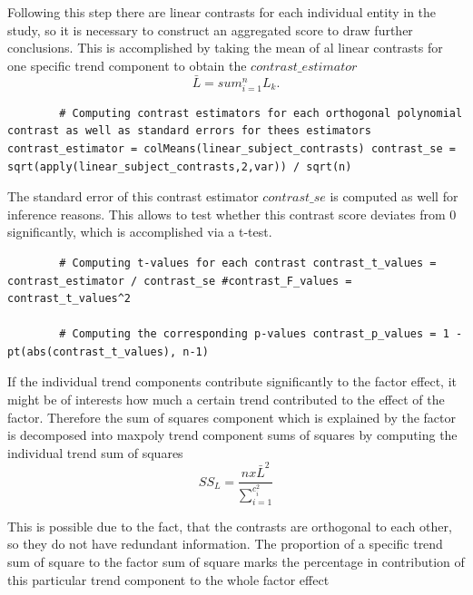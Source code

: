 \documentclass[11pt]{article}
\begin{document}
		Following this step there are linear contrasts for each individual entity in the study, so it is necessary to construct an aggregated score to draw further conclusions. This is accomplished by taking the mean of al linear contrasts for one specific trend component to obtain the $contrast\_estimator$\\
		
		\begin{equation}
		\bar{L} = sum_{i=1}^{n}L_k.
		\end{equation}
		
		\begin{lstlisting}
		# Computing contrast estimators for each orthogonal polynomial contrast as well as standard errors for thees estimators contrast_estimator = colMeans(linear_subject_contrasts) contrast_se = sqrt(apply(linear_subject_contrasts,2,var)) / sqrt(n)
		\end{lstlisting}
		
		The standard error of this contrast estimator $contrast\_se$ is computed as well for inference reasons. This allows to test whether this contrast score deviates from 0 significantly, which is accomplished via a t-test.
		
		\begin{lstlisting}
		# Computing t-values for each contrast contrast_t_values = contrast_estimator / contrast_se #contrast_F_values = contrast_t_values^2
		
		# Computing the corresponding p-values contrast_p_values = 1 - pt(abs(contrast_t_values), n-1)
		\end{lstlisting}
		
		If the individual trend components contribute significantly to the factor effect, it might be of interests how much a certain trend contributed to the effect of the factor. Therefore the sum of squares component which is explained by the factor is decomposed into maxpoly trend component sums of squares by computing the individual trend sum of squares\\
		
	
		\begin{equation}
			SS_L = \frac{n x \bar{L}^2}{\sum_{i=1}^{c_i^2}}
		\end{equation}
		
		This is possible due to the fact, that the contrasts are orthogonal to each other, so they do not have redundant information. The proportion of a specific trend sum of square to the factor sum of square marks the percentage in contribution of this particular trend component to the whole factor effect\\
		
\end{document}
